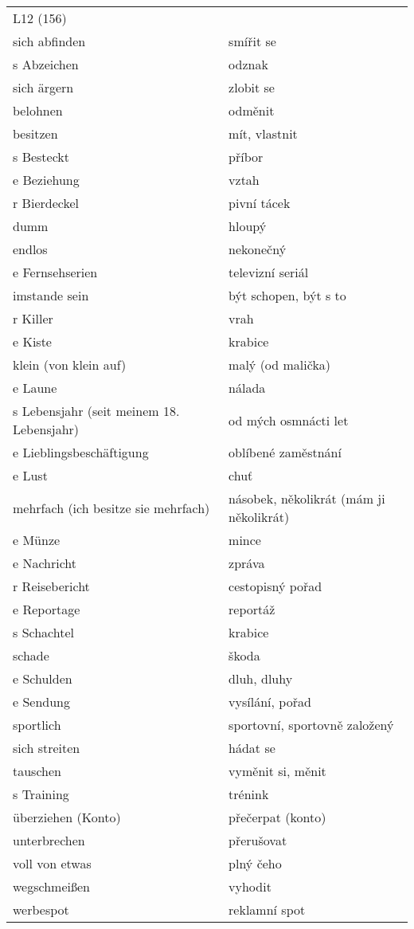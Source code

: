 \documentclass{article}
\begin{document}
\newpage

\begin{tabular}{ p{5cm}|p{5cm}  }
    \\
    L12 (156) \\
    sich abfinden & smířit se\\
    s Abzeichen & odznak\\
    sich ärgern & zlobit se\\
    belohnen & odměnit\\
    besitzen & mít, vlastnit\\
    s Besteckt & příbor\\
    e Beziehung & vztah\\
    r Bierdeckel & pivní tácek\\
    dumm & hloupý\\
    endlos & nekonečný\\
    e Fernsehserien & televizní seriál\\
    imstande sein & být schopen, být s to\\
    r Killer & vrah\\
    e Kiste & krabice\\
    klein (von klein auf)& malý (od malička)\\
    e Laune & nálada\\
    s Lebensjahr (seit meinem 18. Lebensjahr) & od mých osmnácti let\\
    e Lieblingsbeschäftigung & oblíbené zaměstnání\\
    e Lust & chuť\\
    mehrfach (ich besitze sie mehrfach) & násobek, několikrát (mám ji několikrát)\\
    e Münze & mince\\
    e Nachricht & zpráva\\
    r Reisebericht & cestopisný pořad\\
    e Reportage & reportáž\\
    s Schachtel & krabice\\
    schade & škoda\\
    e Schulden & dluh, dluhy\\
    e Sendung & vysílání, pořad\\
    sportlich & sportovní, sportovně založený\\
    sich streiten & hádat se\\
    tauschen & vyměnit si, měnit\\
    s Training & trénink\\
    überziehen (Konto) & přečerpat (konto)\\
    unterbrechen & přerušovat\\
    voll von etwas & plný čeho\\
    wegschmei{\ss}en & vyhodit\\
    werbespot & reklamní spot \\
\end{tabular}
\end{document}
